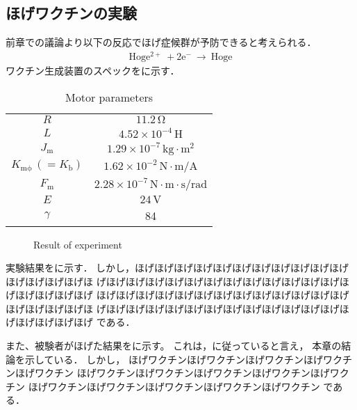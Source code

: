 \begin{small}
\section{ほげワクチンの実験}

前章での議論より以下の反応でほげ症候群が予防できると考えられる．
\begin{eqnarray}
\mathrm{Hoge^{2+} \ + 2e^{-} \ \rightarrow \ Hoge}
\end{eqnarray}
ワクチン生成装置のスペックをに示す．

\begin{table}[b]
\caption{Motor parameters}
\begin{center}
\begin{tabular}{c c}
\toprule
$R$ & $11.2\,\mathrm{\Omega}$ \\
$L$ & $4.52 \times 10^{-4}\,\mathrm{H}$ \\
$J_\mathrm{m}$ & $1.29 \times 10^{-7}\,\mathrm{kg \cdot m^2}$ \\
$K_\mathrm{m\phi}\,(=K_\mathrm{b})$ & $1.62 \times 10^{-2}\,\mathrm{N \cdot m / A}$ \\
$F_\mathrm{m}$ & $2.28 \times 10^{-7}\,\mathrm{N \cdot m \cdot s / rad}$ \\
$E$ & $24\,\mathrm{V}$ \\
$\gamma$ & 84 \\
\bottomrule
\end{tabular}
\end{center}
\end{table}

\begin{figure}[b]
\begin{center}
\caption{Result of experiment}
\end{center}
\end{figure}

実験結果をに示す．
しかし，ほげほげほげほげほげほげほげほげほげほげほげほげほげほげほげほ
げほげほげほげほげほげほげほげほげほげほげほげほげほげほげほげほげほげ
ほげほげほげほげほげほげほげほげほげほげほげほげほげほげほげほげほげほ
げほげほげほげほげほげほげほげほげほげほげほげほげほげほげほげほげほげ
である．


また、被験者がほげた結果をに示す。
これは，に従っていると言え，
本章の結論を示している．
しかし，
ほげワクチンほげワクチンほげワクチンほげワクチンほげワクチン
ほげワクチンほげワクチンほげワクチンほげワクチンほげワクチン
ほげワクチンほげワクチンほげワクチンほげワクチンほげワクチン
である．


\end{small}
